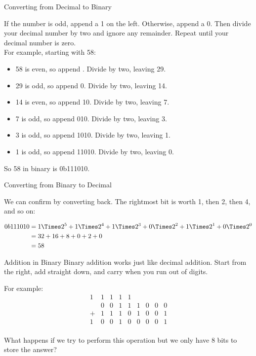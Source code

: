 \begin{frame}{Converting from Decimal to Binary}

	If the number is odd, append a 1 on the left. Otherwise, append a 0. Then
	divide your decimal number by two and ignore any remainder. Repeat until your
	decimal number is zero. \\

	For example, starting with 58:

	\begin{itemize}
		\item 58 is even, so append . Divide by two, leaving 29.
		\item 29 is odd, so append 0. Divide by two, leaving 14.
		\item 14 is even, so append 10. Divide by two, leaving 7.
		\item 7 is odd, so append 010. Divide by two, leaving 3.
		\item 3 is odd, so append 1010. Divide by two, leaving 1.
		\item 1 is odd, so append 11010. Divide by two, leaving 0.
	\end{itemize}

	So 58 in binary is 0b111010.

\end{frame}

\begin{frame}{Converting from Binary to Decimal}

	We can confirm by converting back. The rightmost bit is worth 1, then 2, then
	4, and so on:

	\begin{align*}
		0b111010 & =
		1 \Times 2^5 +
		1 \Times 2^4 +
		1 \Times 2^3 +
		0 \Times 2^2 +
		1 \Times 2^1 +
		0 \Times 2^0                          \\
		         & = 32 + 16  + 8 + 0 + 2 + 0 \\
		         & = 58
	\end{align*}

\end{frame}

\begin{frame}{Addition in Binary}
	Binary addition works just like decimal addition.
	Start from the right, add straight down, and carry when you run out of digits.

	For example:
	\[
		\begin{array}{ccccccccc}
			1 & 1 & 1 & 1 & 1 &   &   &   &   \\
			  & 0 & 0 & 1 & 1 & 1 & 0 & 0 & 0 \\
			+ & 1 & 1 & 1 & 0 & 1 & 0 & 0 & 1 \\
			\hline
			1 & 0 & 0 & 1 & 0 & 0 & 0 & 0 & 1 \\
		\end{array}
	\]

	What happens if we try to perform this operation but we only have 8 bits to
	store the answer?
\end{frame}

